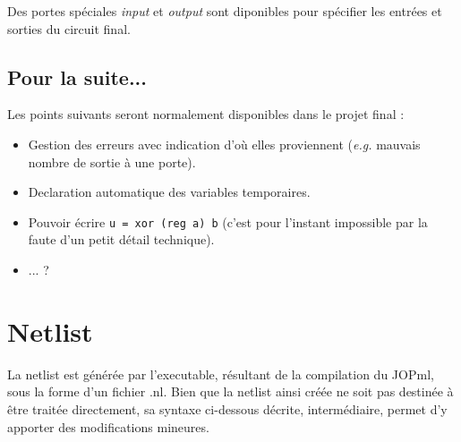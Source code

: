 \documentclass{article}
\begin{document}
Des portes spéciales \emph{input} et \emph{output} sont diponibles pour spécifier les entrées et sorties du circuit final.

\subsection{Pour la suite...}

Les points suivants seront normalement disponibles dans le projet final :
\begin{itemize}
\item Gestion des erreurs avec indication d'où elles proviennent (\emph{e.g.} mauvais nombre de sortie à une porte).
\item Declaration automatique des variables temporaires.
\item Pouvoir écrire \og \verb!u = xor (reg a) b! \fg{} (c'est pour l'instant impossible par la faute d'un petit détail technique).
\item ... ?
\end{itemize}


\section{Netlist}
La netlist est générée par l'executable, résultant de la compilation du JOPml, sous la forme d'un fichier .nl. Bien que la netlist ainsi créée ne soit pas destinée à être traitée directement, sa syntaxe ci-dessous décrite, intermédiaire, permet d'y apporter des modifications mineures.
\end{document}
